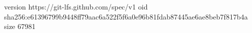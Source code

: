 version https://git-lfs.github.com/spec/v1
oid sha256:e61396799b9448ff79aac6a522f5f6a0e96b81fdab87445ae6ae8beb7f817b4a
size 67981
